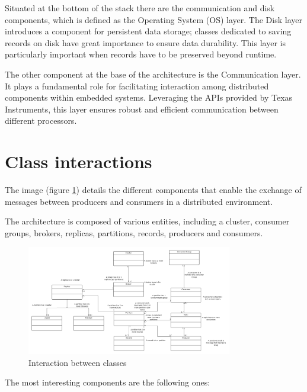 Situated at the bottom of the stack there are the communication and disk
components, which is defined as the Operating System (OS) layer.
The Disk layer introduces a component for persistent data storage; classes
dedicated to saving records on disk have great importance to ensure data
durability.
This layer is particularly important when records have to be preserved beyond
runtime.

The other component at the base of the architecture is the Communication layer.
It plays a fundamental role for facilitating interaction among distributed
components within embedded systems.
Leveraging the APIs provided by Texas Instruments, this layer ensures robust
and efficient communication between different processors.

\section{Class interactions}

The image (figure \ref{fig:class_diagram}) details the different components
that enable the exchange of messages between producers and consumers in a
distributed environment.

The architecture is composed of various entities, including a cluster,
consumer groups, brokers, replicas, partitions, records, producers and
consumers. 

\begin{figure}[H]
    \centering
    \includegraphics[width=0.8\textwidth]{Figures/class_diagram.png}
    \caption{Interaction between classes}
    \label{fig:class_diagram}
\end{figure}

The most interesting components are the following ones:

